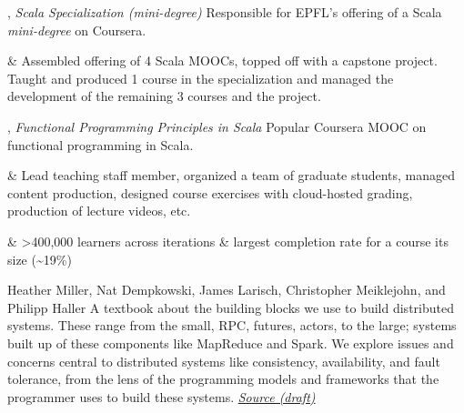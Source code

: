 \documentclass[9pt]{article}
\begin{document}
, {\em Scala Specialization (mini-degree)} 
\newline\noindent Responsible for EPFL's offering of a Scala {\em mini-degree} on Coursera. 
\smallskip
\begin{easylist}[itemize]
& Assembled offering of 4 Scala MOOCs, topped off with a capstone
\newline project. Taught and produced 1 course in the specialization and
\newline managed the development of the remaining 3 courses and the project.
\end{easylist}
\bigskip


, {\em Functional Programming Principles in Scala} 
\newline\noindent Popular Coursera MOOC on functional programming in Scala. 
\smallskip
\begin{easylist}[itemize]
& Lead teaching staff member, organized a team of graduate
\newline students, managed content production, designed course exercises
\newline with cloud-hosted grading, production of lecture videos, etc.

& >400,000 learners across iterations \& largest completion
\newline rate for a course its size (\textasciitilde19\%)
\end{easylist}
\bigskip





\bigskip
{}

\newline\noindent Heather Miller, Nat Dempkowski, James Larisch,
\newline\noindent Christopher Meiklejohn, and Philipp Haller
\smallskip
\newline\noindent A textbook about the building blocks we use to build distributed systems. These range from the small, RPC, futures, actors, to the large; systems built up of these components like MapReduce and Spark. We explore issues and concerns central to distributed systems like consistency, availability, and fault tolerance, from the lens of the programming models and frameworks that the programmer uses to build these systems.
\newline\noindent\href{https://github.com/heathermiller/dist-prog-book}{\em Source (draft)}
\bigskip
\end{document}
